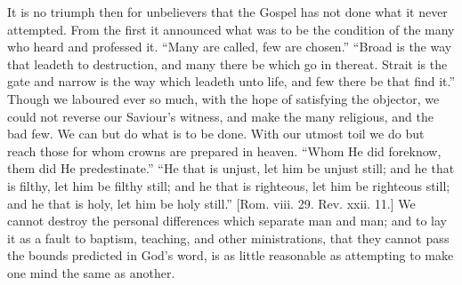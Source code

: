 It is no triumph then for unbelievers that the Gospel has not done
what it never attempted. From the first it announced what was to be
the condition of the many who heard and professed it. ``Many are
called, few are chosen.'' ``Broad is the way that leadeth to
destruction, and many there be which go in thereat. Strait is the gate
and narrow is the way which leadeth unto life, and few there be that
find it.'' Though we laboured ever so much, with the hope of
satisfying the objector, we could not reverse our Saviour's witness,
and make the many religious, and the bad few. We can but do what is to
be done. With our utmost toil we do but reach those for whom crowns
are prepared in heaven. ``Whom He did foreknow, them did He
predestinate.'' ``He that is unjust, let him be unjust still;
and he that is filthy, let him be filthy still; and he that is
righteous, let him be righteous still; and he that is holy, let him be
holy still.'' [Rom. viii. 29. Rev. xxii. 11.] We cannot destroy
the personal differences which separate man and man; and to lay it as
a fault to baptism, teaching, and other ministrations, that they
cannot pass the bounds predicted in God's word, is as little
reasonable as attempting to make one mind the same as another.


